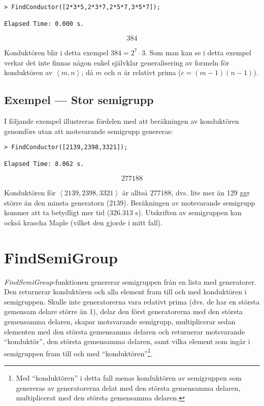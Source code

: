 \begin{verbatim}
> FindConductor([2*3*5,2*3*7,2*5*7,3*5*7]);

Elapsed Time: 0.000 s.
\end{verbatim}
\[384\]

Konduktören blir i detta exempel $384 = 2^7 \cdot 3$. Som man kan se i detta exempel verkar det inte finnas någon enkel självklar generalisering av formeln för konduktören av $\left<m, n\right>$, då $m$ och $n$ är relativt prima ($c = (m-1)(n-1)$).

\subsection{Exempel --- Stor semigrupp}
\label{ExempelStorSemigrupp}

I följande exempel illustreras fördelen med att beräkningen av konduktören genomförs utan att motsvarande semigrupp genereras:

\begin{verbatim}
> FindConductor([2139,2398,3321]);

Elapsed Time: 8.062 s.
\end{verbatim}
\[277188\]

Konduktören för $\left<2139, 2398, 3321\right>$ är alltså $277188$, dvs. lite mer än 129 ggr större än den minsta generatorn ($2139$). Beräkningen av motsvarande semigrupp kommer att ta betydligt mer tid (326.313 s). Utskriften av semigruppen kan också krascha Maple (vilket den gjorde i mitt fall).

\section{FindSemiGroup}

\emph{FindSemiGroup}-funktionen genererar semigruppen från en lista med generatorer. Den returnerar konduktören och alla element fram till och med konduktören i semigruppen. Skulle inte generatorerna vara relativt prima (dvs. de har en största gemensam delare större än 1), delar den först generatorerna med den största gemensamma delaren, skapar motsvarande semigrupp, multiplicerar sedan elementen med den största gemensamma delaren och returnerar motsvarande ``konduktör'', den största gemensamma delaren, samt vilka element som ingår i semigruppen fram till och med ``konduktören''\footnote{Med ``konduktören'' i detta fall menas konduktören av semigruppen som genereras av generatorerna delat med den största gemensamma delaren, multiplicerat med den största gemensamma delaren.}.

